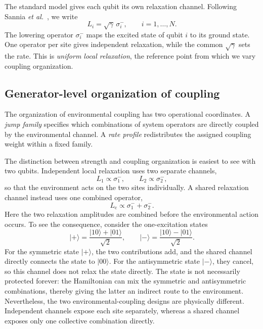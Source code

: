 The standard model gives each qubit its own relaxation channel. Following
Sannia \emph{et al.}~\cite{Sannia2024}, we write
\begin{equation*}
L_i=\sqrt{\gamma}\,\sigma_i^-,\qquad i=1,\ldots,N .
\end{equation*}
The lowering operator \(\sigma_i^-\) maps the excited state of qubit \(i\) to
its ground state. One operator per site gives independent relaxation, while
the common \(\sqrt{\gamma}\) sets the rate. This is \emph{uniform local
relaxation}, the reference point from which we vary coupling organization.

\subsection{Generator-level organization of coupling}

The organization of environmental coupling has two operational coordinates. A
\emph{jump family} specifies which combinations of system operators are
directly coupled by the environmental channel. A \emph{rate profile}
redistributes the assigned coupling weight within a fixed family.

The distinction between strength and coupling organization is easiest to see with two
qubits. Independent local relaxation uses two separate channels,
\begin{equation*}
L_1\propto\sigma_1^-,
\qquad
L_2\propto\sigma_2^-,
\end{equation*}
so that the environment acts on the two sites individually. A shared
relaxation channel instead uses one combined operator,
\begin{equation*}
L_{\mathrm c}\propto\sigma_1^-+\sigma_2^-.
\end{equation*}
Here the two relaxation amplitudes are combined before the environmental
action occurs. To see the consequence, consider the one-excitation states
\begin{equation*}
\lvert+\rangle
  =\frac{\lvert10\rangle+\lvert01\rangle}{\sqrt{2}},
\qquad
\lvert-\rangle
  =\frac{\lvert10\rangle-\lvert01\rangle}{\sqrt{2}}.
\end{equation*}
For the symmetric state \(\lvert+\rangle\), the two contributions add, and the
shared channel directly connects the state to \(\lvert00\rangle\). For the
antisymmetric state \(\lvert-\rangle\), they cancel, so this channel does not
relax the state directly. The state is not necessarily protected forever: the
Hamiltonian can mix the symmetric and antisymmetric combinations, thereby
giving the latter an indirect route to the environment. Nevertheless, the two
environmental-coupling designs are physically different. Independent channels
expose each site separately, whereas a shared channel exposes only one
collective combination directly.


